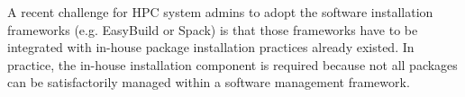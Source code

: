 \documentclass[conference]{IEEEtran}
\begin{document}


A recent challenge for HPC system admins to adopt the software installation frameworks (e.g. EasyBuild\cite{geimer:14} or Spack\cite{gamblin:15}) is that those frameworks have to be integrated with in-house package installation practices already existed. In practice, the in-house installation component is required because not all packages can be satisfactorily managed within a software management framework.
\end{document}
